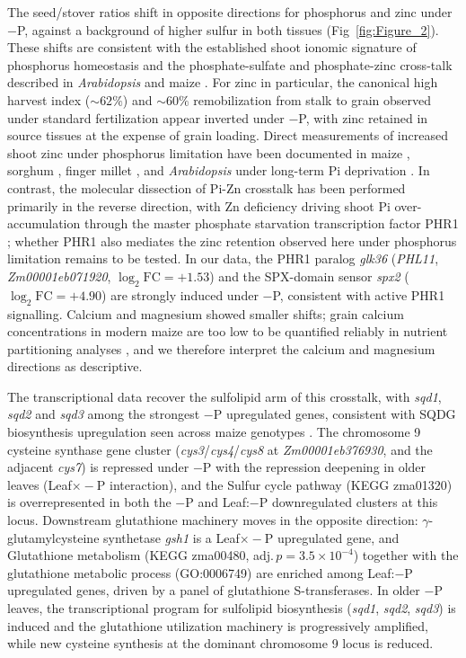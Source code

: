 \documentclass[9pt,twocolumn,twoside]{rilabRxiv}
\begin{document}
The seed/stover ratios shift in opposite directions for phosphorus and zinc under $-$P, against a background of higher sulfur in both tissues (Fig~\ref{fig:Figure_2}).
These shifts are consistent with the established shoot ionomic signature of phosphorus homeostasis \citep{baxter2008} and the phosphate-sulfate and phosphate-zinc cross-talk described in \textit{Arabidopsis} and maize \citep{bielecka2014,bouain2014,wangzou2023,roller2025}.
For zinc in particular, the canonical high harvest index ($\sim 62\%$) and $\sim 60\%$ remobilization from stalk to grain observed under standard fertilization \citep{bender2013} appear inverted under $-$P, with zinc retained in source tissues at the expense of grain loading.
Direct measurements of increased shoot zinc under phosphorus limitation have been documented in maize \citep{soltangheisi2014,saenchai2016}, sorghum \citep{oseni2009}, finger millet \citep{maharajan2023}, and \textit{Arabidopsis} under long-term Pi deprivation \citep{misson2005}.
In contrast, the molecular dissection of Pi-Zn crosstalk has been performed primarily in the reverse direction, with Zn deficiency driving shoot Pi over-accumulation through the master phosphate starvation transcription factor PHR1 \citep{bouain2014,khan2014}; whether PHR1 also mediates the zinc retention observed here under phosphorus limitation remains to be tested.
In our data, the PHR1 paralog \textit{glk36} (\textit{PHL11}, \textit{Zm00001eb071920}, $\log_2{\text{FC}}=+1.53$) and the SPX-domain sensor \textit{spx2} ($\log_2{\text{FC}}=+4.90$) are strongly induced under $-$P, consistent with active PHR1 signalling.
Calcium and magnesium showed smaller shifts; grain calcium concentrations in modern maize are too low to be quantified reliably in nutrient partitioning analyses \citep{bender2013}, and we therefore interpret the calcium and magnesium directions as descriptive.

The transcriptional data recover the sulfolipid arm of this crosstalk, with \textit{sqd1}, \textit{sqd2} and \textit{sqd3} among the strongest $-$P upregulated genes, consistent with SQDG biosynthesis upregulation seen across maize genotypes \citep{he2022}.
The chromosome 9 cysteine synthase gene cluster (\textit{cys3}/\textit{cys4}/\textit{cys8} at \textit{Zm00001eb376930}, and the adjacent \textit{cys7}) is repressed under $-$P with the repression deepening in older leaves (Leaf$\times -$P interaction), and the Sulfur cycle pathway (KEGG zma01320) is overrepresented in both the $-$P and Leaf:$-$P downregulated clusters at this locus.
Downstream glutathione machinery moves in the opposite direction: $\gamma$-glutamylcysteine synthetase \textit{gsh1} is a Leaf$\times -$P upregulated gene, and Glutathione metabolism (KEGG zma00480, adj.\,$p = 3.5 \times 10^{-4}$) together with the glutathione metabolic process (GO:0006749) are enriched among Leaf:$-$P upregulated genes, driven by a panel of glutathione S-transferases.
In older $-$P leaves, the transcriptional program for sulfolipid biosynthesis (\textit{sqd1}, \textit{sqd2}, \textit{sqd3}) is induced and the glutathione utilization machinery is progressively amplified, while new cysteine synthesis at the dominant chromosome 9 locus is reduced.
\end{document}
